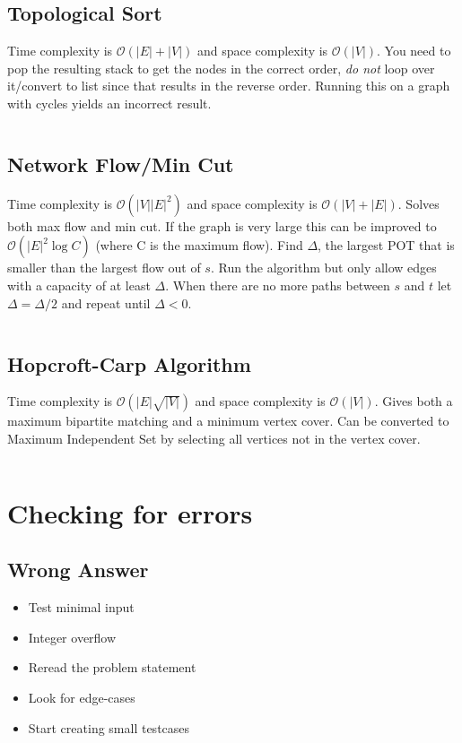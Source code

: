 \documentclass[8pt,a4paper,landscape,oneside]{amsart}
\newcommand{\code}[1]{\inputminted[fontsize=\normalsize,baselinestretch=1]{java}{code/#1}}
\newcommand{\bigO}{\mathcal{O}}
\begin{document}
\begin{multicols*}{3}
  \subsection{Topological Sort}
  Time complexity is $\bigO(|E| + |V|)$ and space complexity is $\bigO(|V|)$. You need to pop the resulting stack to get the nodes in the correct order, \textit{do not} loop over it/convert to list since that results in the reverse order. Running this on a graph with cycles yields an incorrect result.
  \code{Graphs/TopologicalSort.java}
  
  \subsection{Network Flow/Min Cut}
  Time complexity is $\bigO(|V||E|^2)$ and space complexity is $\bigO(|V|+|E|)$. Solves both max flow and min cut. If the graph is very large this can be improved to $\bigO(|E|^2 \log{C})$ (where C is the maximum flow). Find $\Delta$, the largest POT that is smaller than the largest flow out of $s$. Run the algorithm but only allow edges with a capacity of at least $\Delta$. When there are no more paths between $s$ and $t$ let $\Delta = \Delta / 2$ and repeat until $\Delta < 0$.
  \code{Graphs/NetworkFlow.java}
  
  \subsection{Hopcroft-Carp Algorithm}
  Time complexity is $\bigO(|E|\sqrt{|V|})$ and space complexity is $\bigO(|V|)$. Gives both a maximum bipartite matching and a minimum vertex cover. Can be converted to Maximum Independent Set by selecting all vertices not in the vertex cover.
  \code{Graphs/HopcroftCarp.java}
        
        
\section{Checking for errors}
  \subsection{Wrong Answer}
    \begin{itemize}
    \item Test minimal input
    \item Integer overflow
    \item Reread the problem statement
    \item Look for edge-cases
    \item Start creating small testcases
    \end{itemize}

\end{multicols*}
\end{document}
